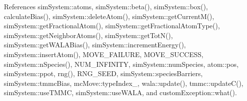 References sim\-System\-::atoms, sim\-System\-::beta(), sim\-System\-::box(), calculate\-Bias(), sim\-System\-::delete\-Atom(), sim\-System\-::get\-Current\-M(), sim\-System\-::get\-Fractional\-Atom(), sim\-System\-::get\-Fractional\-Atom\-Type(), sim\-System\-::get\-Neighbor\-Atoms(), sim\-System\-::get\-Tot\-N(), sim\-System\-::get\-W\-A\-L\-A\-Bias(), sim\-System\-::increment\-Energy(), sim\-System\-::insert\-Atom(), M\-O\-V\-E\-\_\-\-F\-A\-I\-L\-U\-R\-E, M\-O\-V\-E\-\_\-\-S\-U\-C\-C\-E\-S\-S, sim\-System\-::n\-Species(), N\-U\-M\-\_\-\-I\-N\-F\-I\-N\-I\-T\-Y, sim\-System\-::num\-Species, atom\-::pos, sim\-System\-::ppot, rng(), R\-N\-G\-\_\-\-S\-E\-E\-D, sim\-System\-::species\-Barriers, sim\-System\-::tmmc\-Bias, mc\-Move\-::type\-Index\-\_\-, wala\-::update(), tmmc\-::update\-C(), sim\-System\-::use\-T\-M\-M\-C, sim\-System\-::use\-W\-A\-L\-A, and custom\-Exception\-::what().



